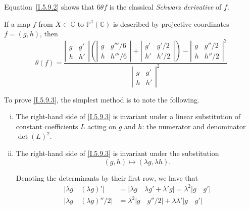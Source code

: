 \documentclass{report}
\theoremstyle{plain}
\theoremstyle{definition}
\newenvironment{env}[1]
    {\renewcommand\theinnercustomenv{#1}\innercustomenv}
    {\endinnercustomenv}
\newcommand{\PP}{\mathbb{P}}
\newcommand{\CC}{\mathbb{C}}
\newcommand{\oldpage}[1]{\marginpar{\footnotesize$\Big\vert$ \textit{p.~#1}}}
\begin{document}
\begin{env}{5.9}
  Equation~\cref{I.5.9.2} shows that $6\theta f$ is the classical \emph{Schwarz derivative} of $f$.

  \bigskip

  If a map $f$ from $X\subset\CC$ to $\PP^1(\CC)$ is described by projective coordinates $f=(g,h)$, then
  \[
  \label{I.5.9.3}
    \theta(f) =
    \frac{
      \left\vert
        \begin{array}{cc}
          g&g'\\h&h'
        \end{array}
      \right\vert
      \left(
        \left\vert
          \begin{array}{cc}
            g&g'''/6\\h&h'''/6
          \end{array}
        \right\vert
        +
        \left\vert
          \begin{array}{cc}
            g'&g'/2\\h'&h'/2
          \end{array}
        \right\vert
      \right)
      -
      \left\vert
        \begin{array}{cc}
          g&g''/2\\h&h''/2
        \end{array}
      \right\vert^2
    }{
      \left\vert
        \begin{array}{cc}
          g&g'\\h&h'
        \end{array}
      \right\vert^2
    }
  \tag{5.9.3}
  \]

  To prove \cref{I.5.9.3}, the simplest method is to note the following.
\oldpage{34}
  \begin{enumerate}[(i)]
    \item The right-hand side of \cref{I.5.9.3} is invariant under a linear substitution of constant coefficients $L$ acting on $g$ and $h$: the numerator and denominator $\det(L)^2$.
    \item The right-hand side of \cref{I.5.9.3} is invariant under the substitution
      \[
        (g,h) \mapsto (\lambda g,\lambda h).
      \]

      Denoting the determinants by their first row, we have that
      \[
        \begin{aligned}
          |\lambda g \quad (\lambda g)'|
          &= |\lambda g \quad \lambda g'+\lambda' g|
          = \lambda^2|g \quad g'|
        \\[1em]
          |\lambda g \quad (\lambda g)''/2|
          &= \lambda^2|g \quad g''/2| + \lambda\lambda'|g \quad g'|
        \end{aligned}
      \]
  \end{enumerate}
\end{env}
\end{document}
